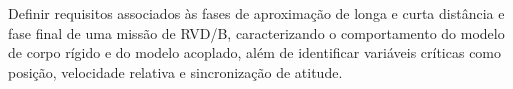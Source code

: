 
    
    
    

Definir requisitos associados às fases de aproximação de longa e curta distância e fase final de uma missão de RVD/B, caracterizando o comportamento do modelo de corpo rígido e do modelo acoplado, além de identificar variáveis críticas como posição, velocidade relativa e sincronização de atitude.

